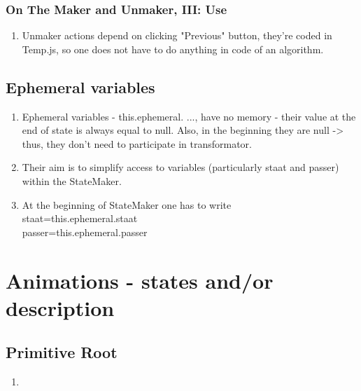 \documentclass[12pt]{article}
\begin{document}
\subsubsection{On The Maker and Unmaker, III: Use}
\begin {enumerate}
	\item Unmaker actions depend on clicking "Previous" button, they're coded in Temp.js, so one does not have to do anything in code of an algorithm.
\end {enumerate}
\subsection {Ephemeral variables}
\begin{enumerate}
	\item Ephemeral variables - this.ephemeral. ..., have no memory - their value at the end of state is always equal to null. Also, in the beginning they are null -> thus, they don't need to participate in transformator.
	\item Their aim is to simplify access to variables (particularly staat and passer) within the StateMaker.
	\item At the beginning of StateMaker one has to write\\
	staat=this.ephemeral.staat\\
	passer=this.ephemeral.passer
\end{enumerate}


\section{Animations - states and/or description}
\subsection{Primitive Root}
\begin{enumerate}
	\item 
\end{enumerate}
\end{document}
